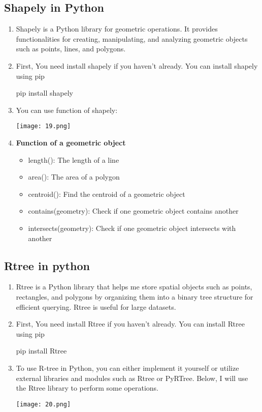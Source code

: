 \documentclass[12pt]{scrartcl}
\begin{document}
\subsection{Shapely in Python}
    \begin{enumerate}
        \item Shapely is a Python library for geometric operations. It provides functionalities for creating, manipulating, and analyzing geometric objects such as points, lines, and polygons.
        \item  First, You need install shapely if you  haven't already. You can install shapely using pip
    
     \begin{gitbox}
         pip install shapely
     \end{gitbox}

     \item You can use function of shapely:
        \begin{center}
            \texttt{[image: 19.png]}
        \end{center}
    \item \textbf{Function of a geometric object}
        \begin{itemize}
            \item length(): The length of a line 
            \item area(): The area of a polygon
            \item centroid(): Find the centroid of a geometric object
            \item contains(geometry): Check if one geometric object contains another 
            \item intersects(geometry): Check if one geometric object intersects with another 
        \end{itemize}
    \end{enumerate}

\newpage
\subsection{Rtree in python}
\begin{enumerate}
\item Rtree is a Python library that helps me store spatial objects such as points, rectangles, and polygons by organizing them into a binary tree structure for efficient querying. Rtree is useful for large datasets.
         \item  First, You need install Rtree if you  haven't already. You can install Rtree using pip
    
     \begin{gitbox} 
        pip install Rtree
     \end{gitbox}

    
\item To use R-tree in Python, you can either implement it yourself or utilize external libraries and modules such as Rtree or PyRTree. Below, I will use the Rtree library to perform some operations.
        \begin{center}
            \texttt{[image: 20.png]}
        \end{center}
    \end{enumerate}
\end{document}

